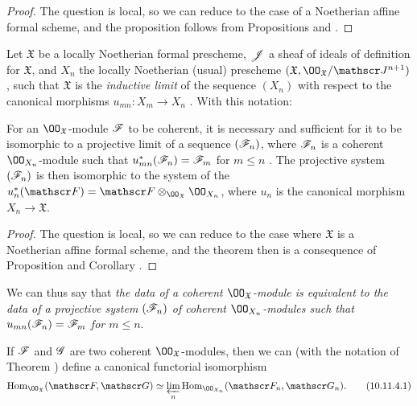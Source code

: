 \begin{proof}
\label{proof-1.10.11.1}
The question is local, so we can reduce to the case of a Noetherian affine formal scheme, and the proposition follows from Propositions  and .
\end{proof}

\begin{env}[10.11.2]
\label{1.10.11.2}
Let $\mathfrak{X}$ be a locally Noetherian formal prescheme, $\mathscr{J}$ a sheaf of ideals of definition for $\mathfrak{X}$, and $X_n$ the locally Noetherian (usual) prescheme $(\mathfrak{X},\OO_\mathfrak{X}/\sh{J}^{n+1})$, such that $\mathfrak{X}$ is the \emph{inductive limit} of the sequence $(X_n)$ with respect to the canonical morphisms $u_{mn}:X_m\to X_n$ .
With this notation:
\end{env}

\begin{thm}[10.11.3]
\label{1.10.11.3}
For an $\OO_\mathfrak{X}$-module $\mathscr{F}$ to be coherent, it is necessary and sufficient for it to be isomorphic to a projective limit of a sequence $(\mathscr{F}_n)$, where $\mathscr{F}_n$ is a coherent $\OO_{X_n}$-module such that $u_{mn}^*(\mathscr{F}_n)=\mathscr{F}_m$ for $m\leq n$ .
The projective system $(\mathscr{F}_n)$ is then isomorphic to the system of the $u_n^*(\sh{F})=\sh{F}\otimes_{\OO_\mathfrak{X}}\OO_{X_n}$, where $u_n$ is the canonical morphism $X_n\to\mathfrak{X}$.
\end{thm}

\begin{proof}
\label{proof-1.10.11.3}
The question is local, so we can reduce to the case where $\mathfrak{X}$ is a Noetherian affine formal scheme, and the theorem then is a consequence of Proposition  and Corollary .
\end{proof}

We can thus say that \emph{the data of a coherent $\OO_\mathfrak{X}$-module is equivalent to the data of a projective system $(\mathscr{F}_n)$ of coherent $\OO_{X_n}$-modules such that $u_{mn}(\mathscr{F}_n)=\mathscr{F}_m$ for $m\leq n$}.

\begin{cor}[10.11.4]
\label{1.10.11.4}
If $\mathscr{F}$ and $\mathscr{G}$ are two coherent $\OO_\mathfrak{X}$-modules, then we can (with the notation of Theorem ) define a canonical functorial isomorphism
\[
  \Hom_{\OO_\mathfrak{X}}(\sh{F},\sh{G})\isoto\varprojlim_n\Hom_{\OO_{X_n}}(\sh{F}_n,\sh{G}_n).
  \tag{10.11.4.1}
\]
\end{cor}

